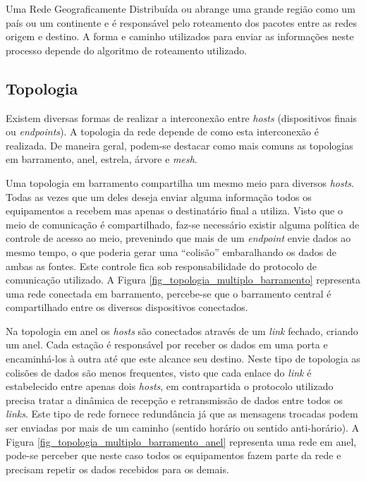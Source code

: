 Uma Rede Geograficamente Distribuída ou  abrange uma grande região como um país ou um continente e é responsável pelo roteamento dos pacotes entre as redes origem e destino. A forma e caminho utilizados para enviar as informações neste processo depende do algoritmo de roteamento utilizado. \cite{Book-Tanenbaum2003}

\subsection{Topologia}
Existem diversas formas de realizar a interconexão entre \emph{hosts} (dispositivos finais ou \emph{endpoints}). A topologia da rede depende de como esta interconexão é realizada. De maneira geral, podem-se destacar como mais comuns as topologias em barramento, anel, estrela, árvore e \emph{mesh}.

Uma topologia em barramento compartilha um mesmo meio para diversos \emph{hosts}. Todas as vezes que um deles deseja enviar alguma informação todos os equipamentos a recebem mas apenas o destinatário final a utiliza. Visto que o meio de comunicação é compartilhado, faz-se necessário existir alguma política de controle de acesso ao meio, prevenindo que mais de um \emph{endpoint} envie dados ao mesmo tempo, o que poderia gerar uma ``colisão'' embaralhando os dados de ambas as fontes. Este controle fica sob responsabilidade do protocolo de comunicação utilizado. A Figura \ref{fig_topologia_multiplo_barramento} representa uma rede conectada em barramento, percebe-se que o barramento central é compartilhado entre os diversos dispositivos conectados.


Na topologia em anel os \emph{hosts} são conectados através de um \emph{link} fechado, criando um anel. Cada estação é responsável por receber os dados em uma porta e encaminhá-los à outra até que este alcance seu destino. Neste tipo de topologia as colisões de dados são menos frequentes, visto que cada enlace do \emph{link} é estabelecido entre apenas dois \emph{hosts}, em contrapartida o protocolo utilizado precisa tratar a dinâmica de recepção e retransmissão de dados entre todos os \emph{links}. Este tipo de rede fornece redundância já que as mensagens trocadas podem ser enviadas por mais de um caminho (sentido horário ou sentido anti-horário). A Figura \ref{fig_topologia_multiplo_barramento_anel} representa uma rede em anel, pode-se perceber que neste caso todos os equipamentos fazem parte da rede e precisam repetir os dados recebidos para os demais.

